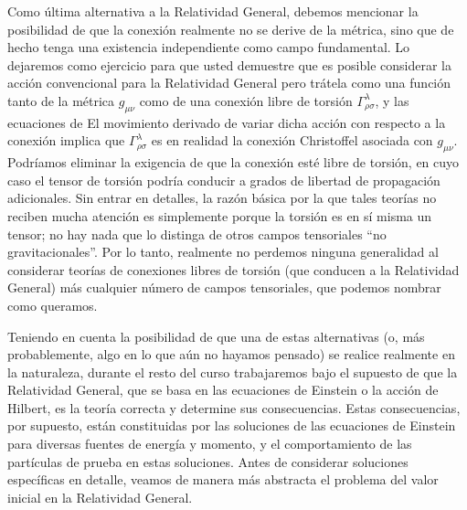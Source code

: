 \documentclass[11pt,b5paper,openany,twoside]{book}
\newcommand{\mn}{{\mu\nu}}
\begin{document}
Como última alternativa a la Relatividad General, debemos mencionar la posibilidad de que la conexión realmente no se derive de la métrica, sino que de hecho tenga una existencia independiente como campo fundamental.
Lo dejaremos como ejercicio para que usted demuestre que es posible considerar la acción convencional para la Relatividad General pero trátela como una función tanto de la métrica $g_\mn$ como de una conexión libre de torsión $\Gamma^\lambda_{\rho\sigma}$, y las ecuaciones de El movimiento derivado de variar dicha acción con respecto a la conexión implica que $\Gamma^\lambda_{\rho\sigma}$ es en realidad la conexión Christoffel asociada con $g_\mn$.
Podríamos eliminar la exigencia de que la conexión esté libre de torsión, en cuyo caso el tensor de torsión podría conducir a grados de libertad de propagación adicionales.
Sin entrar en detalles, la razón básica por la que tales teorías no reciben mucha atención es simplemente porque la torsión es en sí misma un tensor; no hay nada que lo distinga de otros campos tensoriales ``no gravitacionales''.
Por lo tanto, realmente no perdemos ninguna generalidad al considerar teorías de conexiones libres de torsión (que conducen a la Relatividad General) más cualquier número de campos tensoriales, que podemos nombrar como queramos.

Teniendo en cuenta la posibilidad de que una de estas alternativas (o, más probablemente, algo en lo que aún no hayamos pensado) se realice realmente en la naturaleza, durante el resto del curso trabajaremos bajo el supuesto de que la Relatividad General, que se basa en las ecuaciones de Einstein o la acción de Hilbert, es la teoría correcta y determine sus consecuencias.
Estas consecuencias, por supuesto, están constituidas por las soluciones de las ecuaciones de Einstein para diversas fuentes de energía y momento, y el comportamiento de las partículas de prueba en estas soluciones.
Antes de considerar soluciones específicas en detalle, veamos de manera más abstracta el problema del valor inicial en la Relatividad General.
\end{document}
